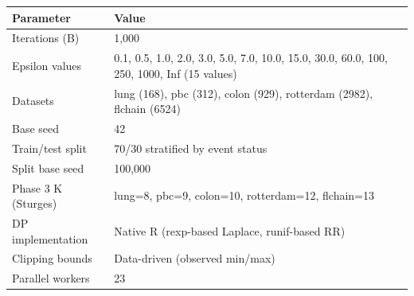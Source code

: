 \begin{tabular}{ll}
  \toprule
Parameter & Value \\ 
  \midrule
Iterations (B) & 1,000 \\ 
  Epsilon values & 0.1, 0.5, 1.0, 2.0, 3.0, 5.0, 7.0, 10.0, 15.0, 30.0, 60.0, 100, 250, 1000, Inf (15 values) \\ 
  Datasets & lung (168), pbc (312), colon (929), rotterdam (2982), flchain (6524) \\ 
  Base seed & 42 \\ 
  Train/test split & 70/30 stratified by event status \\ 
  Split base seed & 100,000 \\ 
  Phase 3 K (Sturges) & lung=8, pbc=9, colon=10, rotterdam=12, flchain=13 \\ 
  DP implementation & Native R (rexp-based Laplace, runif-based RR) \\ 
  Clipping bounds & Data-driven (observed min/max) \\ 
  Parallel workers & 23 \\ 
   \bottomrule
\end{tabular}
